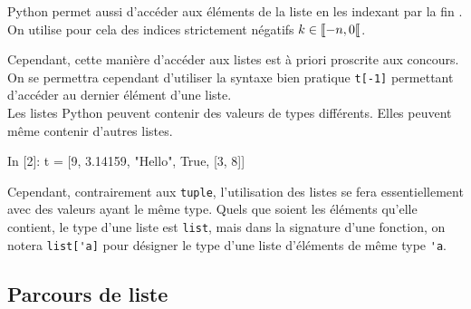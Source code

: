 \documentclass{magnolia}
\begin{document}
Python permet aussi d'accéder aux éléments de la liste en les indexant \og par la fin \fg. On utilise
pour cela des indices strictement négatifs $k\in\left\llbracket -n,0\right\llbracket$.
\begin{center}
\end{center}
Cependant, cette manière d'accéder aux listes est à priori proscrite aux concours. On se permettra
cependant d'utiliser la syntaxe bien pratique \verb!t[-1]! permettant d'accéder au dernier
élément d'une liste.\\

Les listes Python peuvent contenir des valeurs de types différents. Elles peuvent même contenir d'autres listes.

\begin{pythoncode}
In [2]: t = [9, 3.14159, "Hello", True, [3, 8]]
\end{pythoncode}

\noindent
Cependant, contrairement aux \verb_tuple_, l'utilisation des listes se fera essentiellement
avec des valeurs ayant le même type. Quels que soient les éléments qu'elle contient, le type d'une
liste est \verb!list!, mais dans la signature d'une fonction, on notera \verb!list['a]! pour désigner
le type d'une liste d'éléments de même type \verb!'a!.

\subsection{Parcours de liste}
\end{document}
